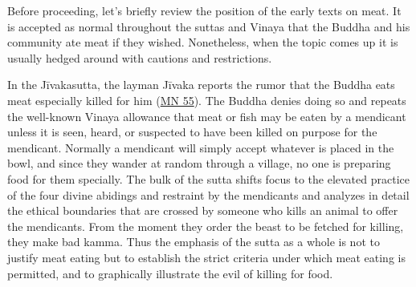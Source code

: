 \documentclass[12pt,openany]{book}%
\begin{document}
Before proceeding, let’s briefly review the position of the early texts on meat. It is accepted as normal throughout the suttas and Vinaya that the Buddha and his community ate meat if they wished. Nonetheless, when the topic comes up it is usually hedged around with cautions and restrictions.

In the \textsanskrit{Jīvakasutta}, the layman \textsanskrit{Jīvaka} reports the rumor that the Buddha eats meat especially killed for him (\href{https://suttacentral.net/mn55/en/sujato}{MN 55}). The Buddha denies doing so and repeats the well-known Vinaya allowance that meat or fish may be eaten by a mendicant unless it is seen, heard, or suspected to have been killed on purpose for the mendicant. Normally a mendicant will simply accept whatever is placed in the bowl, and since they wander at random through a village, no one is preparing food for them specially. The bulk of the sutta shifts focus to the elevated practice of the four divine abidings and restraint by the mendicants and analyzes in detail the ethical boundaries that are crossed by someone who kills an animal to offer the mendicants. From the moment they order the beast to be fetched for killing, they make bad kamma. Thus the emphasis of the sutta as a whole is not to justify meat eating but to establish the strict criteria under which meat eating is permitted, and to graphically illustrate the evil of killing for food.
\end{document}
